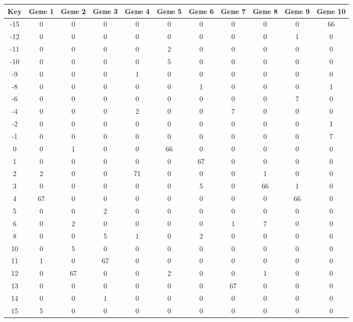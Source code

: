 \begin{tabular}{|c|c|c|c|c|c|c|c|c|c|c|}
\hline
Key & Gene 1 & Gene 2 & Gene 3 & Gene 4 & Gene 5 & Gene 6 & Gene 7 & Gene 8 & Gene 9 & Gene 10 \\
\hline
-15 & 0 & 0 & 0 & 0 & 0 & 0 & 0 & 0 & 0 & 66 \\
-12 & 0 & 0 & 0 & 0 & 0 & 0 & 0 & 0 & 1 & 0 \\
-11 & 0 & 0 & 0 & 0 & 2 & 0 & 0 & 0 & 0 & 0 \\
-10 & 0 & 0 & 0 & 0 & 5 & 0 & 0 & 0 & 0 & 0 \\
-9 & 0 & 0 & 0 & 1 & 0 & 0 & 0 & 0 & 0 & 0 \\
-8 & 0 & 0 & 0 & 0 & 0 & 1 & 0 & 0 & 0 & 1 \\
-6 & 0 & 0 & 0 & 0 & 0 & 0 & 0 & 0 & 7 & 0 \\
-4 & 0 & 0 & 0 & 2 & 0 & 0 & 7 & 0 & 0 & 0 \\
-2 & 0 & 0 & 0 & 0 & 0 & 0 & 0 & 0 & 0 & 1 \\
-1 & 0 & 0 & 0 & 0 & 0 & 0 & 0 & 0 & 0 & 7 \\
0 & 0 & 1 & 0 & 0 & 66 & 0 & 0 & 0 & 0 & 0 \\
1 & 0 & 0 & 0 & 0 & 0 & 67 & 0 & 0 & 0 & 0 \\
2 & 2 & 0 & 0 & 71 & 0 & 0 & 0 & 1 & 0 & 0 \\
3 & 0 & 0 & 0 & 0 & 0 & 5 & 0 & 66 & 1 & 0 \\
4 & 67 & 0 & 0 & 0 & 0 & 0 & 0 & 0 & 66 & 0 \\
5 & 0 & 0 & 2 & 0 & 0 & 0 & 0 & 0 & 0 & 0 \\
6 & 0 & 2 & 0 & 0 & 0 & 0 & 1 & 7 & 0 & 0 \\
8 & 0 & 0 & 5 & 1 & 0 & 2 & 0 & 0 & 0 & 0 \\
10 & 0 & 5 & 0 & 0 & 0 & 0 & 0 & 0 & 0 & 0 \\
11 & 1 & 0 & 67 & 0 & 0 & 0 & 0 & 0 & 0 & 0 \\
12 & 0 & 67 & 0 & 0 & 2 & 0 & 0 & 1 & 0 & 0 \\
13 & 0 & 0 & 0 & 0 & 0 & 0 & 67 & 0 & 0 & 0 \\
14 & 0 & 0 & 1 & 0 & 0 & 0 & 0 & 0 & 0 & 0 \\
15 & 5 & 0 & 0 & 0 & 0 & 0 & 0 & 0 & 0 & 0 \\
\hline
\end{tabular}